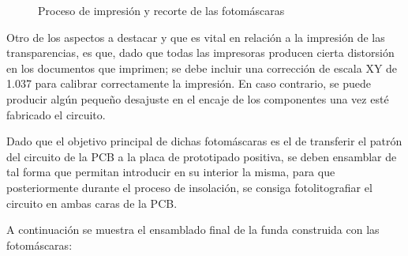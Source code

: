 \begin{itemize}
    \begin{figure}[H]
    \centering
    \caption{Proceso de impresión y recorte de las fotomáscaras} \label{fig:lego}
    \end{figure}
    
     Otro de los aspectos a destacar y que es vital en relación a la impresión de las transparencias, es que, dado que todas las impresoras producen cierta distorsión en los documentos que imprimen; se debe incluir una corrección de escala XY de 1.037 para calibrar correctamente la impresión. En caso contrario, se puede producir algún pequeño desajuste en el encaje de los componentes una vez esté fabricado el circuito.
    
    Dado que el objetivo principal de dichas fotomáscaras es el de transferir el patrón del circuito de la \ac{PCB} a la placa de prototipado positiva, se deben ensamblar de tal forma que permitan introducir en su interior la misma, para que posteriormente durante el proceso de insolación, se consiga fotolitografiar el circuito en ambas caras de la \ac{PCB}.
    
    A continuación se muestra el ensamblado final de la funda construida con las fotomáscaras:
    

\end{itemize}

